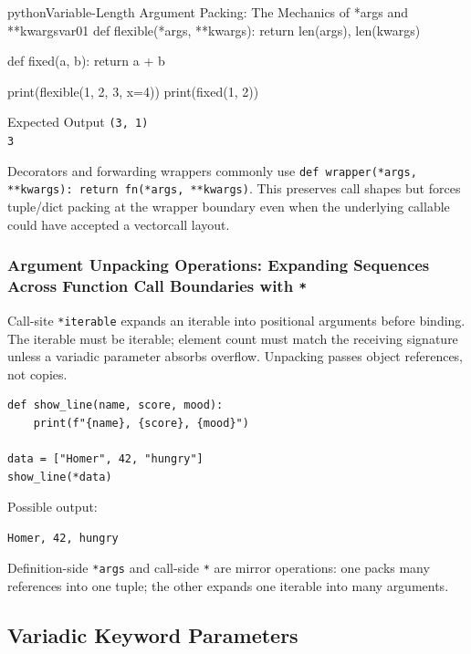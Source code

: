 \documentclass[a4paper,twoside]{report}
\begin{document}
\begin{codebox}[]{python}{Variable-Length Argument Packing: The Mechanics of *args and **kwargs}{var01}
def flexible(*args, **kwargs):
    return len(args), len(kwargs)

def fixed(a, b):
    return a + b

print(flexible(1, 2, 3, x=4))
print(fixed(1, 2))
\end{codebox}


\begin{iobox}{Expected Output}
\texttt{(3, 1)} \\
\texttt{3} \\
\end{iobox}




Decorators and forwarding wrappers commonly use \texttt{def wrapper(*args, **kwargs): return fn(*args, **kwargs)}. This preserves call shapes but forces tuple/dict packing at the wrapper boundary even when the underlying callable could have accepted a vectorcall layout.

\subsubsection{Argument Unpacking Operations: Expanding Sequences Across Function Call Boundaries with \texttt{*}}

Call-site \texttt{*iterable} expands an iterable into positional arguments before binding. The iterable must be iterable; element count must match the receiving signature unless a variadic parameter absorbs overflow. Unpacking passes object references, not copies.

\begin{verbatim}
def show_line(name, score, mood):
    print(f"{name}, {score}, {mood}")

data = ["Homer", 42, "hungry"]
show_line(*data)
\end{verbatim}

Possible output:

\begin{verbatim}
Homer, 42, hungry
\end{verbatim}

Definition-side \texttt{*args} and call-side \texttt{*} are mirror operations: one packs many references into one tuple; the other expands one iterable into many arguments.


\subsection{Variadic Keyword Parameters}
\end{document}
